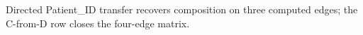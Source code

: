 Directed Patient\_ID transfer recovers composition on three computed edges; the C-from-D row closes the four-edge matrix.
